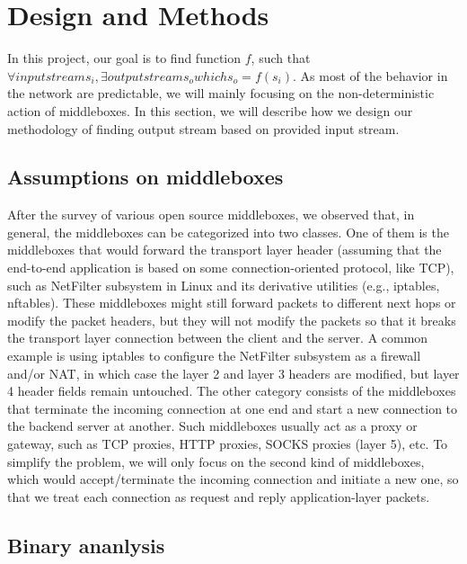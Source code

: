 \section{Design and Methods}

In this project, our goal is to find function $f$, such that
\(\forall input stream s_i, \exists output stream s_o which s_o = f(s_i)\).
As most of the behavior in the network are predictable, we will mainly focusing
on the non-deterministic action of middleboxes.  In this section, we will
describe how we design our methodology of finding output stream based on
provided input stream.

\subsection{Assumptions on middleboxes}

After the survey of various open source middleboxes, we observed that, in
general, the middleboxes can be categorized into two classes. One of them is the
middleboxes that would forward the transport layer header (assuming that the
end-to-end application is based on some connection-oriented protocol, like TCP),
such as NetFilter subsystem in Linux and its derivative utilities (e.g.,
iptables, nftables). These middleboxes might still forward packets to different
next hops or modify the packet headers, but they will not modify the packets so
that it breaks the transport layer connection between the client and the server.
A common example is using iptables to configure the NetFilter subsystem as a
firewall and/or NAT, in which case the layer 2 and layer 3 headers are modified,
but layer 4 header fields remain untouched. The other category consists of the
middleboxes that terminate the incoming connection at one end and start a new
connection to the backend server at another. Such middleboxes usually act as a
proxy or gateway, such as TCP proxies, HTTP proxies, SOCKS proxies (layer 5),
etc. To simplify the problem, we will only focus on the second kind of
middleboxes, which would accept/terminate the incoming connection and initiate a
new one, so that we treat each connection as request and reply application-layer
packets.

\subsection{Binary ananlysis}

